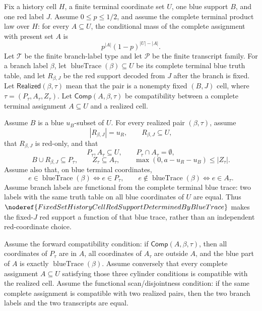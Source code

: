 \begin{helper}
Fix a history cell \(H\), a finite terminal coordinate set \(U\), one blue
support \(B\), and one red label \(J\).  Assume \(0\le p\le1/2\), and assume
the complete terminal product law over \(H\): for every \(A\subseteq U\),
the conditional mass of the complete assignment with present set \(A\) is
\[
p^{|A|}(1-p)^{|U|-|A|}.
\]
Let \(\mathcal T\) be the finite branch-label type and let \(\mathcal P\) be
the finite transcript family.  For a branch label \(\beta\), let
\(\operatorname{blueTrace}(\beta)\subseteq U\) be its complete terminal blue
truth table, and let \(R_{\beta,J}\) be the red support decoded from \(J\)
after the branch is fixed.  Let
\(\mathsf{Realized}(\beta,\tau)\) mean that the pair is a nonempty fixed
\((B,J)\) cell, where \(\tau=(P_\tau,A_\tau,Z_\tau)\).  Let
\(\mathsf{Comp}(A,\beta,\tau)\) be compatibility between a complete terminal
assignment \(A\subseteq U\) and a realized cell.

Assume \(B\) is a blue \(u_B\)-subset of \(U\).  For every realized pair
\((\beta,\tau)\), assume
\[
|R_{\beta,J}|=u_R,\qquad R_{\beta,J}\subseteq U,
\]
that \(R_{\beta,J}\) is red-only, and that
\[
P_\tau,A_\tau\subseteq U,\qquad P_\tau\cap A_\tau=\emptyset,
\]
\[
B\cup R_{\beta,J}\subseteq P_\tau,\qquad Z_\tau\subseteq A_\tau,\qquad
\max(0,a-u_R-u_B)\le |Z_\tau|.
\]
Assume also that, on blue terminal coordinates,
\[
e\in\operatorname{blueTrace}(\beta)\Longleftrightarrow e\in P_\tau,
\qquad
e\notin\operatorname{blueTrace}(\beta)\Longleftrightarrow e\in A_\tau .
\]
Assume branch labels are functional from the complete terminal blue trace:
two labels with the same truth table on all blue coordinates of \(U\) are
equal.  Thus
\(\noderef{FixedSetHistoryCellRedSupportDeterminedByBlueTrace}\) makes the
fixed-\(J\) red support a function of that blue trace, rather than an
independent red-coordinate choice.

Assume the forward compatibility condition: if
\(\mathsf{Comp}(A,\beta,\tau)\), then all coordinates of \(P_\tau\) are in
\(A\), all coordinates of \(A_\tau\) are outside \(A\), and the blue part of
\(A\) is exactly \(\operatorname{blueTrace}(\beta)\).  Assume conversely
that every complete assignment \(A\subseteq U\) satisfying those three
cylinder conditions is compatible with the realized cell.  Assume the
functional scan/disjointness condition: if the same complete assignment is
compatible with two realized pairs, then the two branch labels and the two
transcripts are equal.


\end{helper}
